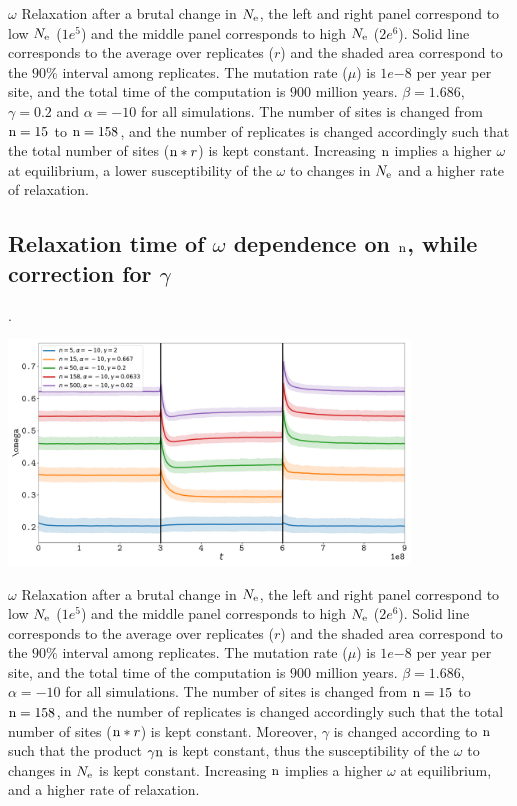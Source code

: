 \documentclass{article}
\renewcommand*{\bm}[1]{#1}%
\begin{document}
$\omega$ Relaxation after a brutal change in $N_{\mathrm{e}}$, the left and right panel correspond to low $N_{\mathrm{e}}$ ($1e^{5}$) and the middle panel corresponds to high $N_{\mathrm{e}}$ ($2e^{6}$). 
Solid line corresponds to the average over replicates ($r$) and the shaded area correspond to the $90\%$ interval among replicates. 
The mutation rate ($\mu$) is $1e{-8}$ per year per site, and the total time of the computation is $900$ million years.
$\beta=1.686$, $\gamma=0.2$ and $\alpha=-10$ for all simulations. The number of sites is changed from $\text{n}=15$ to $\text{n}=158$, and the number of replicates is changed accordingly such that the total number of sites ($\text{n}*r$) is kept constant.
Increasing $\text{n}$ implies a higher $\omega$ at equilibrium, a lower susceptibility of the $\omega$ to changes in $N_{\mathrm{e}}$ and a higher rate of relaxation.

\subsection{Relaxation time of $\bm{\omega}$ dependence on $\text{n}$, while correction for $\gamma$}.
\begin{center}
 \includegraphics[width=0.8\textwidth] {artworks/Relaxation-Stability-Gamma.pdf}
\end{center}
$\omega$ Relaxation after a brutal change in $N_{\mathrm{e}}$, the left and right panel correspond to low $N_{\mathrm{e}}$ ($1e^{5}$) and the middle panel corresponds to high $N_{\mathrm{e}}$ ($2e^{6}$). 
Solid line corresponds to the average over replicates ($r$) and the shaded area correspond to the $90\%$ interval among replicates. 
The mutation rate ($\mu$) is $1e{-8}$ per year per site, and the total time of the computation is $900$ million years.
$\beta=1.686$, $\alpha=-10$ for all simulations. The number of sites is changed from $\text{n}=15$ to $\text{n}=158$, and the number of replicates is changed accordingly such that the total number of sites ($\text{n}*r$) is kept constant.
Moreover, $\gamma$ is changed according to $\text{n}$ such that the product $\gamma\text{n}$ is kept constant, thus the  susceptibility of the $\omega$ to changes in $N_{\mathrm{e}}$ is kept constant.
Increasing $\text{n}$ implies a higher $\omega$ at equilibrium, and a higher rate of relaxation.
\end{document}

